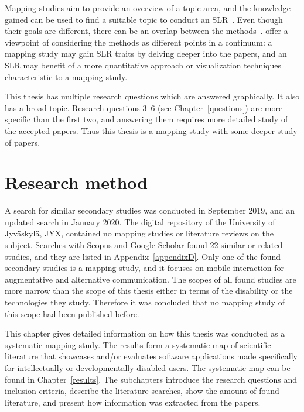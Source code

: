 \documentclass[utf8,english]{gradu3}
\begin{document}
Mapping studies aim to provide an overview of a topic area, and the knowledge gained can be used
to find a suitable topic to conduct an SLR~\parencite{petersen2008, kitchenham2011}.
Even though their goals are different, there can be an overlap between the methods~\parencite{kitchenham2011}.
\textcite{petersen2008} offer a viewpoint of considering the methods as different points in a continuum:
a mapping study may gain SLR traits by delving deeper into the papers, and an SLR may benefit of a more
quantitative approach or visualization techniques characteristic to a mapping study.

This thesis has multiple research questions which are answered graphically. It also has a broad topic.
Research questions 3--6 (see Chapter~\ref{questions}) are more specific than the first two,
and answering them requires more detailed study of the accepted papers.
Thus this thesis is a mapping study with some deeper study of papers.


\chapter{Research method} \label{method}

A search for similar secondary studies was conducted in September 2019, and an updated search in January 2020.
The digital repository of the University of Jyväskylä, JYX, contained no mapping studies or literature reviews on the subject.
Searches with Scopus and Google Scholar found 22 similar or related studies, and they are listed in Appendix~\ref{appendixD}.
Only one of the found secondary studies \parencite{ascari2018} is a mapping study,
and it focuses on mobile interaction for augmentative and alternative communication.
The scopes of all found studies are more narrow than the scope of this thesis either in terms of the disability or
the technologies they study.
Therefore it was concluded that no mapping study of this scope had been published before.

This chapter gives detailed information on how this thesis was conducted as a systematic mapping study.
The results form a systematic map of scientific literature that showcases and/or evaluates
software applications made specifically for intellectually or developmentally disabled users.
The systematic map can be found in Chapter~\ref{results}.
The subchapters introduce the research questions and inclusion criteria, describe the literature searches,
show the amount of found literature, and present how information was extracted from the papers.
\end{document}
